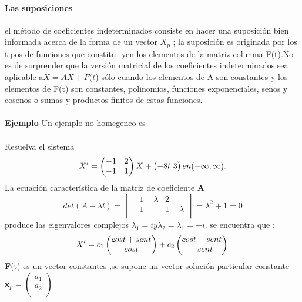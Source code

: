 \documentclass[11.5pt]{article}
\begin{document}
\paragraph{Las suposiciones }
el método de coeficientes indeterminados consiste en hacer una suposición bien informada acerca de la forma de un vector $X_p$ ; la suposición es originada por los tipos de funciones que constitu-
yen los elementos de la matriz columna F(t).No es de sorprender que la versión matricial de los coeficientes indeterminados sea aplicable a$ X=AX +F(t$) sólo cuando los elementos de A son constantes y los elementos de F(t) son constantes, polinomios, funciones exponenciales, senos y cosenos o sumas y productos finitos de estas funciones.\\
\vspace{0.6cm}\\
\textbf{Ejemplo}
Un ejemplo no homegeneo es \\
\vspace{0.4cm}\\
Resuelva el sistema\\
$$
\left.
X'=\begin{pmatrix}
-1&2\\
-1&1\\
\end{pmatrix}
X +
\begin{pmatrix}
-8t\ 
3\\  
\end{pmatrix}\\
en (-\infty,\infty).
\right.
$$
La ecuación característica de la matriz de coeficiente \textbf{A}
$$
\left.
det(A-\lambda l)=\begin{vmatrix}
-1-\lambda&2\\
-1&1-\lambda\\
\end{vmatrix}
=\lambda^2+1=0
\right.
$$
produce las eigenvalores complejos $\lambda_1=i y \lambda_2=\lambda_1=-i.$ se encuentra que :
$$
\left.
X'=c_1\begin{pmatrix}
cost+sent\\
cost\\
\end{pmatrix}
 +c_2
\begin{pmatrix}
cost-sent\\ 
-sent\\  
\end{pmatrix}\\
\right.
$$
\textbf{F}(t) es un vector constantes ,se supone un vector solución particular constante $\textbf{x}_p=\begin{pmatrix}
a_1\\
a_2\\
\end{pmatrix}$
\end{document}
